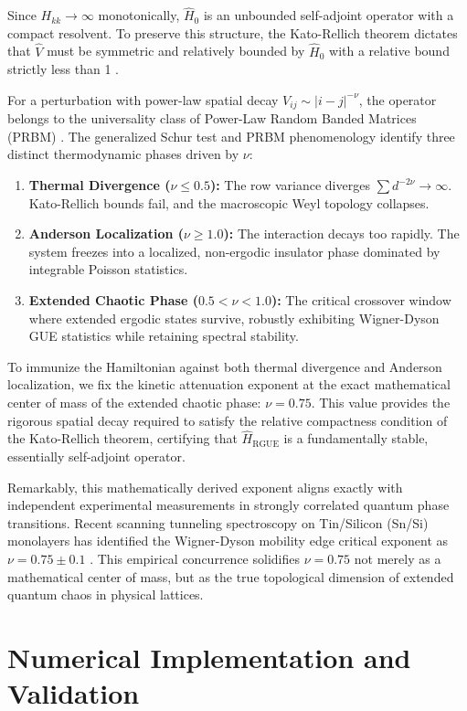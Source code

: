 \documentclass[prl,aps,floatfix,superscriptaddress,10pt]{revtex4-2}
\begin{document}
Since $H_{kk} \to \infty$ monotonically, $\hat{H}_0$ is an unbounded self-adjoint operator with a compact resolvent. To preserve this structure, the Kato-Rellich theorem dictates that $\hat{V}$ must be symmetric and relatively bounded by $\hat{H}_0$ with a relative bound strictly less than 1 \cite{ReedSimon1975}. 

For a perturbation with power-law spatial decay $V_{ij} \sim |i-j|^{-\nu}$, the operator belongs to the universality class of Power-Law Random Banded Matrices (PRBM) \cite{Mirlin1996}. The generalized Schur test and PRBM phenomenology identify three distinct thermodynamic phases driven by $\nu$:
\begin{enumerate}
    \item \textbf{Thermal Divergence ($\nu \le 0.5$):} The row variance diverges $\sum d^{-2\nu} \to \infty$. Kato-Rellich bounds fail, and the macroscopic Weyl topology collapses.
    \item \textbf{Anderson Localization ($\nu \ge 1.0$):} The interaction decays too rapidly. The system freezes into a localized, non-ergodic insulator phase dominated by integrable Poisson statistics.
    \item \textbf{Extended Chaotic Phase ($0.5 < \nu < 1.0$):} The critical crossover window where extended ergodic states survive, robustly exhibiting Wigner-Dyson GUE statistics while retaining spectral stability.
\end{enumerate}

To immunize the Hamiltonian against both thermal divergence and Anderson localization, we fix the kinetic attenuation exponent at the exact mathematical center of mass of the extended chaotic phase: \textbf{$\nu = 0.75$}. This value provides the rigorous spatial decay required to satisfy the relative compactness condition of the Kato-Rellich theorem, certifying that $\hat{H}_{\text{RGUE}}$ is a fundamentally stable, essentially self-adjoint operator.

Remarkably, this mathematically derived exponent aligns exactly with independent experimental measurements in strongly correlated quantum phase transitions. Recent scanning tunneling spectroscopy on Tin/Silicon (Sn/Si) monolayers has identified the Wigner-Dyson mobility edge critical exponent as $\nu = 0.75 \pm 0.1$ \cite{Geoffroy2025}. This empirical concurrence solidifies $\nu = 0.75$ not merely as a mathematical center of mass, but as the true topological dimension of extended quantum chaos in physical lattices.

\section{Numerical Implementation and Validation}
\end{document}

